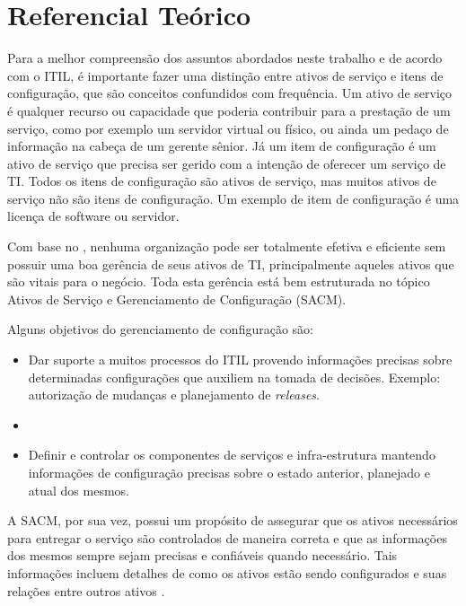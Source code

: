 \chapter{Referencial Teórico}
Para a melhor compreensão dos assuntos abordados neste trabalho e de acordo com o ITIL, é importante fazer uma distinção entre ativos de serviço e itens de configuração, que são conceitos confundidos com frequência. Um ativo de serviço é qualquer recurso ou capacidade que poderia contribuir para a prestação de um serviço, como por exemplo um servidor virtual ou físico, ou ainda um pedaço de informação na cabeça de um gerente sênior. Já um item de configuração é um ativo de serviço que precisa ser gerido com a intenção de oferecer um serviço de TI. Todos os itens de configuração são ativos de serviço, mas muitos ativos de serviço não são itens de configuração. Um exemplo de item de configuração é uma licença	 de software ou servidor.

Com base no , nenhuma organização pode ser totalmente efetiva e eficiente sem possuir uma boa gerência de seus ativos de TI, principalmente aqueles ativos que são vitais para o negócio. Toda esta gerência está bem estruturada no tópico Ativos de Serviço e Gerenciamento de Configuração (SACM).

Alguns objetivos do gerenciamento de configuração são:

\begin{itemize}
\item Dar suporte a muitos processos do ITIL provendo informações precisas sobre determinadas configurações que auxiliem na tomada de decisões. Exemplo: autorização de mudanças e planejamento de \textit{releases}.
\item %
\item Definir e controlar os componentes de serviços e infra-estrutura mantendo informações de configuração precisas sobre o estado anterior, planejado e atual dos mesmos.
\end{itemize}

A SACM, por sua vez, possui um propósito de assegurar que os ativos necessários para entregar o serviço são controlados de maneira correta e que as informações dos mesmos sempre sejam precisas e confiáveis quando necessário. Tais informações incluem detalhes de como os ativos estão sendo configurados e suas relações entre outros ativos \cite{itil2011}.

